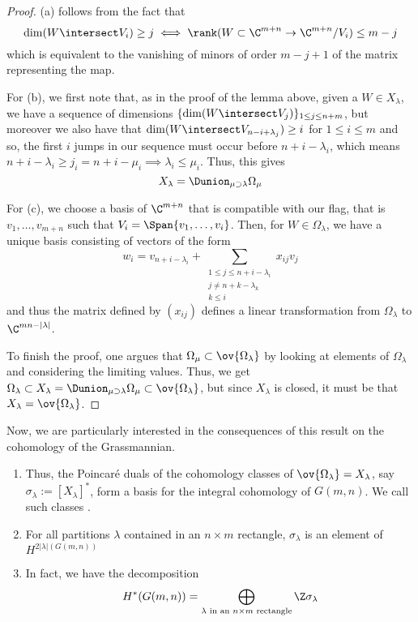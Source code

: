 \documentclass[11pt,leqno,oneside]{amsart}
\numberwithin{thm}{section}
\begin{document}
\begin{proof}
  (a) follows from the fact that \[
    \dim(W \intersect V_i) \geq j \iff \rank(W \subset \C^{m+n} \to
    \C^{m+n}/V_i) \leq m-j
  \]
  which is equivalent to the vanishing of minors of order \(m-j+1\) of
  the matrix representing the map.

  For (b), we first note that, as in the proof of the lemma above,
  given a \(W \in 
  X_\lambda\), we have a sequence of dimensions \(\{\dim(W \intersect
  V_j)\}_{1 \leq j \leq n+m}\), but moreover we also
  have that \(\dim(W \intersect V_{n-i+\lambda_j}) \geq i\) for \(1
  \leq i \leq m\) and so, the first \(i\) jumps in our sequence must
  occur before \(n+i-\lambda_i\), which means \(n+i-\lambda_i \geq j_i
  = n+i-\mu_i \implies \lambda_i \leq \mu_i\). Thus, this gives \[
    X_\lambda = \Dunion_{\mu \supset \lambda} \Omega_\mu
  \]

  For (c), we choose a basis of \(\C^{m+n}\) that is compatible with
  our flag, that is \(v_1, \ldots, v_{m+n}\) such that \(V_i =
  \Span\{v_1, \ldots, v_i\}\). Then, for \(W \in \Omega_\lambda\), we
  have a unique basis consisting of vectors of the form \[
    w_i = v_{n+i-\lambda_i} + \sum_{\substack{1 \leq j \leq
        n+i-\lambda_i \\ j \neq n+k-\lambda_k \\ k \leq i}} x_{ij} v_j
  \]
  and thus the matrix defined by \((x_{ij})\) defines a linear
  transformation from \(\Omega_\lambda\) to \(\C^{mn-|\lambda|}\).

  To finish the proof, one argues that \(\Omega_\mu \subset
  \ov{\Omega_\lambda}\) by looking at elements of \(\Omega_\lambda\)
  and considering the limiting values. Thus, we get \(\Omega_\lambda
  \subset X_\lambda = \Dunion_{\mu \supset \lambda} \Omega_\mu \subset
  \ov{\Omega_\lambda}\), but since \(X_\lambda\) is closed, it must be
  that \(X_\lambda = \ov{\Omega_\lambda}\).
\end{proof}
Now, we are particularly interested in the consequences of this result
on the cohomology of the Grassmannian.
\begin{cor}\label{schubert-classes-form-basis}
  \begin{enumerate}
  \item   Thus, the Poincar\'{e} duals of the cohomology classes of
    \(\ov{\Omega_\lambda} = X_\lambda\), say \(\sigma_\lambda :=
    [X_\lambda]^*\), form a basis for the 
    integral cohomology of \(G(m,n)\). We call such classes
    .
  \item For
    all partitions \(\lambda\) contained in an \(n \times m\)
    rectangle, \(\sigma_\lambda\) is an element of
    \(H^{2|\lambda|(G(m,n))}\)
  \item In fact, we have the decomposition \[
      H^*(G(m,n)) = \bigoplus_{\lambda \text{ in an }n \times m\text{
          rectangle}} \Z \sigma_\lambda
    \]
  \end{enumerate}
\end{cor}
\end{document}
